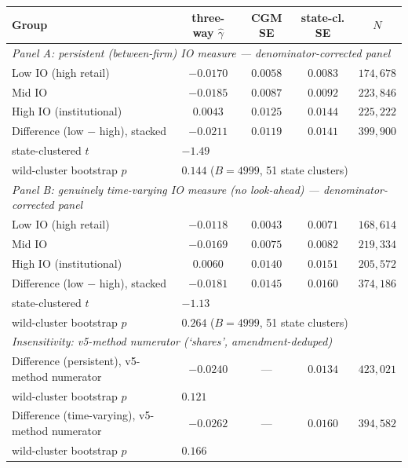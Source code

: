 \begin{tabular}{lcccc}
\hline\hline
Group & three-way $\hat\gamma$ & CGM SE & state-cl. SE & $N$ \\
\hline
\multicolumn{5}{l}{\textit{Panel A: persistent (between-firm) IO measure --- denominator-corrected panel}} \\
Low IO (high retail) & $-0.0170$ & $0.0058$ & $0.0083$ & $174,678$ \\
Mid IO & $-0.0185$ & $0.0087$ & $0.0092$ & $223,846$ \\
High IO (institutional) & $0.0043$ & $0.0125$ & $0.0144$ & $225,222$ \\
Difference (low $-$ high), stacked & $-0.0211$ & $0.0119$ & $0.0141$ & $399,900$ \\
\quad state-clustered $t$ & \multicolumn{4}{l}{$-1.49$} \\
\quad wild-cluster bootstrap $p$ & \multicolumn{4}{l}{$0.144$ ($B=4999$, 51 state clusters)} \\
\hline
\multicolumn{5}{l}{\textit{Panel B: genuinely time-varying IO measure (no look-ahead) --- denominator-corrected panel}} \\
Low IO (high retail) & $-0.0118$ & $0.0043$ & $0.0071$ & $168,614$ \\
Mid IO & $-0.0169$ & $0.0075$ & $0.0082$ & $219,334$ \\
High IO (institutional) & $0.0060$ & $0.0140$ & $0.0151$ & $205,572$ \\
Difference (low $-$ high), stacked & $-0.0181$ & $0.0145$ & $0.0160$ & $374,186$ \\
\quad state-clustered $t$ & \multicolumn{4}{l}{$-1.13$} \\
\quad wild-cluster bootstrap $p$ & \multicolumn{4}{l}{$0.264$ ($B=4999$, 51 state clusters)} \\
\hline
\multicolumn{5}{l}{\textit{Insensitivity: v5-method numerator (`shares', amendment-deduped)}} \\
Difference (persistent), v5-method numerator & $-0.0240$ & --- & $0.0134$ & $423,021$ \\
\quad wild-cluster bootstrap $p$ & \multicolumn{4}{l}{$0.121$} \\
Difference (time-varying), v5-method numerator & $-0.0262$ & --- & $0.0160$ & $394,582$ \\
\quad wild-cluster bootstrap $p$ & \multicolumn{4}{l}{$0.166$} \\
\hline\hline
\end{tabular}
